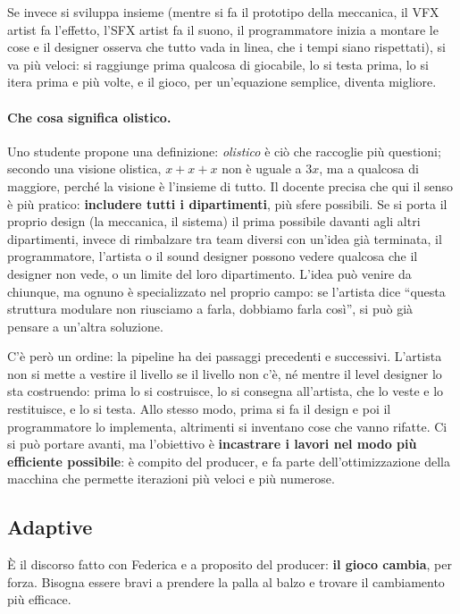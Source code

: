 Se invece si sviluppa insieme (mentre si fa il prototipo della meccanica, il
VFX artist fa l'effetto, l'SFX artist fa il suono, il programmatore inizia a
montare le cose e il designer osserva che tutto vada in linea, che i tempi
siano rispettati), si va più veloci: si raggiunge prima qualcosa di giocabile,
lo si testa prima, lo si itera prima e più volte, e il gioco, per
un'equazione semplice, diventa migliore.

\paragraph{Che cosa significa olistico.} Uno studente propone una definizione:
\emph{olistico} è ciò che raccoglie più questioni; secondo una visione
olistica, $x + x + x$ non è uguale a $3x$, ma a qualcosa di maggiore, perché la
visione è l'insieme di tutto. Il docente precisa che qui il senso è più
pratico: \textbf{includere tutti i dipartimenti}, più sfere possibili. Se si
porta il proprio design (la meccanica, il sistema) il prima possibile davanti
agli altri dipartimenti, invece di rimbalzare tra team diversi con un'idea
già terminata, il programmatore, l'artista o il sound designer possono vedere
qualcosa che il designer non vede, o un limite del loro dipartimento. L'idea
può venire da chiunque, ma ognuno è specializzato nel proprio campo: se
l'artista dice ``questa struttura modulare non riusciamo a farla, dobbiamo
farla così'', si può già pensare a un'altra soluzione.

C'è però un ordine: la pipeline ha dei passaggi precedenti e successivi.
L'artista non si mette a vestire il livello se il livello non c'è, né mentre
il level designer lo sta costruendo: prima lo si costruisce, lo si consegna
all'artista, che lo veste e lo restituisce, e lo si testa. Allo stesso modo,
prima si fa il design e poi il programmatore lo implementa, altrimenti si
inventano cose che vanno rifatte. Ci si può portare avanti, ma l'obiettivo è
\textbf{incastrare i lavori nel modo più efficiente possibile}: è compito del
producer, e fa parte dell'ottimizzazione della macchina che permette
iterazioni più veloci e più numerose.

\subsection{Adaptive}

È il discorso fatto con Federica e a proposito del producer: \textbf{il gioco
cambia}, per forza. Bisogna essere bravi a prendere la palla al balzo e
trovare il cambiamento più efficace.


